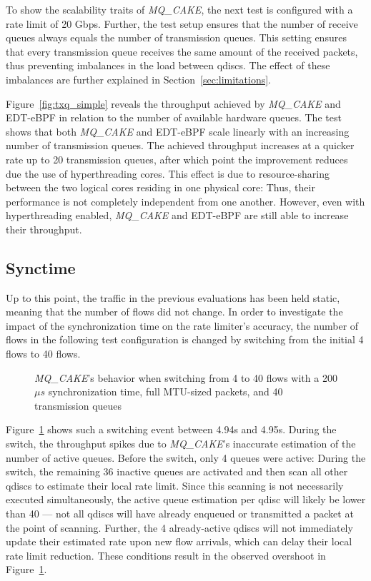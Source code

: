 To show the scalability traits of \textit{MQ\_CAKE}, the next test is configured with a rate limit of 20 Gbps.
%
Further, the test setup ensures that the number of receive queues always equals the number of transmission queues.
%
This setting ensures that every transmission queue receives the same amount of the received packets, thus preventing imbalances in the load between qdiscs.
%
The effect of these imbalances are further explained in Section~\ref{sec:limitations}.
%

Figure~\ref{fig:txq_simple} reveals the throughput achieved by \textit{MQ\_CAKE} and EDT-eBPF in relation to the number of available hardware queues.
%
The test shows that both \textit{MQ\_CAKE} and EDT-eBPF scale linearly with an increasing number of transmission queues.
%
The achieved throughput increases at a quicker rate up to 20 transmission queues, after which point the improvement reduces due the use of hyperthreading cores.
%
This effect is due to resource-sharing between the two logical cores residing in one physical core:
%
Thus, their performance is not completely independent from one another.
%
However, even with hyperthreading enabled, \textit{MQ\_CAKE} and EDT-eBPF are still able to increase their throughput.

\subsection{Synctime}\label{sec:synchronization-time}
Up to this point, the traffic in the previous evaluations has been held static, meaning that the number of flows did not change.
%
In order to investigate the impact of the synchronization time on the rate limiter's accuracy, the number of flows in the following test configuration is changed by switching from the  initial 4 flows to 40 flows.
%
\begin{figure}
    \centering
    
    \caption{\textit{MQ\_CAKE}'s behavior when switching from 4 to 40 flows with a 200$\mu s$ synchronization time, full MTU-sized packets, and 40 transmission queues}\label{fig:switching_200us}
\end{figure}
%

Figure~\ref{fig:switching_200us} shows such a switching event between 4.94s and 4.95s.
%
During the switch, the throughput spikes due to \textit{MQ\_CAKE}'s inaccurate estimation of the number of active queues.
%
Before the switch, only 4 queues were active: During the switch, the remaining 36 inactive queues are activated and then scan all other qdiscs to estimate their local rate limit.
%
Since this scanning is not necessarily executed simultaneously, the active queue estimation per qdisc will likely be lower than 40 --- not all qdiscs will have already enqueued or transmitted a packet at the point of scanning.
%
Further, the 4 already-active qdiscs will not immediately update their estimated rate upon new flow arrivals, which can delay their local rate limit reduction.
%
These conditions result in the observed overshoot in Figure~\ref{fig:switching_200us}.
%

